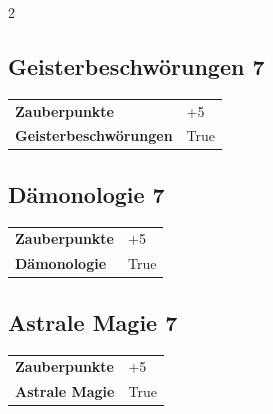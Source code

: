 \begin{multicols}{2}
\begin{tcolorbox}
    \subsection*{Geisterbeschwörungen \hfill \small{7 }}
    \tcblower




\begin{tabular}{@{}ll@{}}
    \textbf{Zauberpunkte} & +5\\
    \textbf{Geisterbeschwörungen} & True\\
\end{tabular}


\end{tcolorbox}

\begin{tcolorbox}
    \subsection*{Dämonologie \hfill \small{7 }}
    \tcblower




\begin{tabular}{@{}ll@{}}
    \textbf{Zauberpunkte} & +5\\
    \textbf{Dämonologie} & True\\
\end{tabular}


\end{tcolorbox}

\begin{tcolorbox}
    \subsection*{Astrale Magie \hfill \small{7 }}
    \tcblower




\begin{tabular}{@{}ll@{}}
    \textbf{Zauberpunkte} & +5\\
    \textbf{Astrale Magie} & True\\
\end{tabular}


\end{tcolorbox}
\end{multicols}
